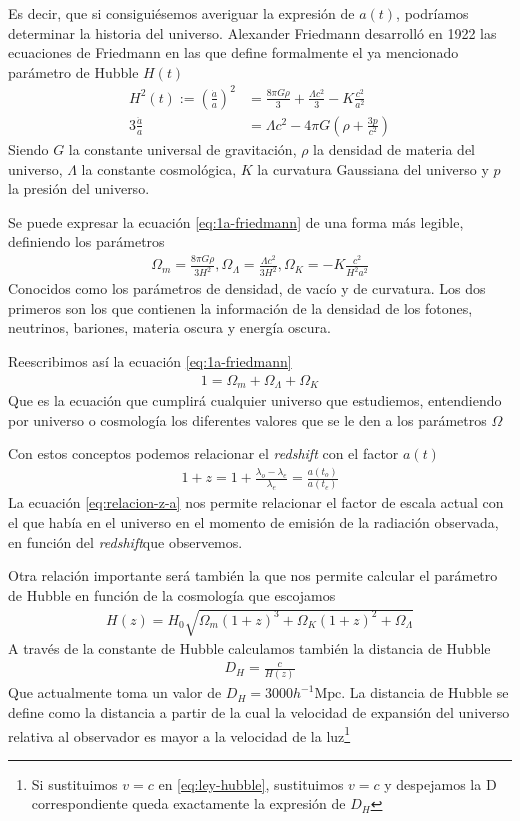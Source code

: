 Es decir, que si consiguiésemos averiguar la expresión de $a(t)$, podríamos determinar la historia del universo. Alexander Friedmann desarrolló en 1922 las ecuaciones de Friedmann en las que define formalmente el ya mencionado parámetro de Hubble $H(t)$
\begin{align}
	H^2(t) := \left(\frac{\dot a}{a}\right)^2 &=  \frac{8\pi G \rho}{3} +\frac{  \Lambda c^2}{3} - K \frac{c^2}{a^2}
	\label{eq:1a-friedmann}\\
	3 \frac{\ddot a}{a} &= \Lambda c^2 - 4\pi G \left( \rho + \frac{3p}{c^2} \right) 
	\label{eq:2a-friedmann}
\end{align}
Siendo  $G$ la constante universal de gravitación, $\rho$ la densidad de materia del universo, $\Lambda$ la constante cosmológica, $K$ la curvatura Gaussiana del universo y  $p$ la presión del universo.

Se puede expresar la ecuación \eqref{eq:1a-friedmann} de una forma más legible, definiendo los parámetros 
\begin{align}
\Omega_m = \frac{8\pi G \rho}{3H^2}, \Omega_\Lambda = \frac{\Lambda c^2}{3H^2}, \Omega_K = -K\frac{c^2}{H^2a^2} 
\end{align}
Conocidos como los parámetros de densidad, de vacío y de curvatura. Los dos primeros son los que contienen la información de la densidad de los fotones, neutrinos, bariones, materia oscura y energía oscura.

Reescribimos así la ecuación \eqref{eq:1a-friedmann}
\begin{align}
	1 = \Omega_m + \Omega_\Lambda + \Omega_K
\end{align}
Que es la ecuación que cumplirá cualquier universo que estudiemos, entendiendo por universo o cosmología los diferentes valores que se le den a los parámetros $\Omega$

Con estos conceptos podemos relacionar el \textit{redshift} con el factor $a(t)$ 
\begin{align}
	1+z = 1+  \frac{\lambda_o - \lambda_e}{\lambda_e} = \frac{a(t_o)}{a(t_e)}
	\label{eq:relacion-z-a}
\end{align}
La ecuación \eqref{eq:relacion-z-a} nos permite relacionar el factor de escala actual con el que había en el universo en el momento de emisión de la radiación observada, en función del \textit{redshift}que observemos.

Otra relación importante será también la que nos permite calcular el parámetro de Hubble en función de la cosmología que escojamos 
\begin{align}
	H(z) = H_0 \sqrt{\Omega_m(1+z)^3 + \Omega_K(1+z)^2 + \Omega_\Lambda} 
\end{align}
A través de la constante de Hubble calculamos también la distancia de Hubble 
\begin{align}
	D_H = \frac{c}{H(z)}
	\label{eq:distancia-hubble}
\end{align}
Que actualmente toma un valor de $D_H = 3000h^{-1}\text{Mpc}$. La distancia de Hubble se define como la distancia a partir de la cual la velocidad de expansión del universo relativa al observador es mayor a la velocidad de la luz\footnote{Si sustituimos $v=c$ en \eqref{eq:ley-hubble}, sustituimos $v=c$ y despejamos la D correspondiente queda exactamente la expresión de $D_H$}


